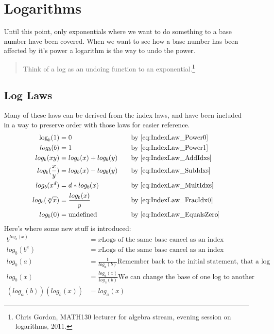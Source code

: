 \section{Logarithms}
\label{sec:Logarithms}
Until this point, only exponentials where we want to do something to a base
number have been covered. When we want to see how a base number has been
affected by it's power a logarithm is the way to undo the power.
\begin{quote}
  Think of a log as an undoing function to an exponential.\footnote{Chris
  Gordon, MATH130 lecturer for algebra stream, evening session on logarithms,
  2011.}
\end{quote}

\subsection{Log Laws}
\label{sec:LogLaws}
Many of these laws can be derived from the index laws, and have been included
in a way to preserve order with those laws for easier reference.
\begin{align}
  \log_b(1)           & = 0                         & \quad & \text{by
  \eqref{eq:IndexLaw_Power0}} \\ log_b(b)           & = 1                         & \quad & \text{by \eqref{eq:IndexLaw_Power1}} \\
  log_b(xy)          & = log_b(x) + log_b(y)       & \quad & \text{by \eqref{eq:IndexLaw_AddIdxs}} \\
  log_b(\frac{x}{y}) & = log_b(x) - log_b(y)       & \quad & \text{by \eqref{eq:IndexLaw_SubIdxs}} \\
  log_b(x^d)         & = d * log_b(x)              & \quad & \text{by \eqref{eq:IndexLaw_MultIdxs}} \\
  log_b(\sqrt[y]{x}) & = \frac{log_b(x)}{y}        & \quad & \text{by \eqref{eq:IndexLaw_FracIdx0}} \\
  log_b(0)           & = \text{undefined}          & \quad & \text{by \eqref{eq:IndexLaw_EqualsZero}} \\
\end{align}
Here's where some new stuff is introduced:
\begin{align}
  b^{log_b(x)}       & = x \text{Logs of the same base cancel as an index} \label{eq:LogLaw_BaseCancel0} \\
  log_b(b^x)         & = x \text{Logs of the same base cancel as an index} \label{eq:LogLaw_BaseCancel1} \\
  log_b(a)           & = \frac{1}{log_a(b)} \text{Remember back to the initial statement, that a log is an inverting function?} \label{eq:LogLaw_Inversion} \\
  log_b(x)           & = \frac{log_a(x)}{log_a(b)} \text{We can change the base of one log to another} \label{eq:LogLaw_ChangeBase} \\
  (log_a(b))(log_b(x)) & = log_a(x) 
%
\end{align}

